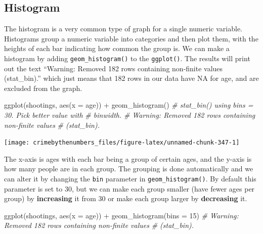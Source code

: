 \documentclass[
  a4paper,
]{krantz}
\makeatletter
\newenvironment{Shaded}{\begin{snugshade}}{\end{snugshade}}
\newcommand{\AttributeTok}[1]{\textcolor[rgb]{0.61,0.61,0.61}{#1}}
\newcommand{\CommentTok}[1]{\textcolor[rgb]{0.37,0.37,0.37}{\textit{#1}}}
\newcommand{\DecValTok}[1]{\textcolor[rgb]{0.06,0.06,0.06}{#1}}
\newcommand{\FunctionTok}[1]{\textcolor[rgb]{0,0,0}{#1}}
\newcommand{\NormalTok}[1]{#1}
\newcommand{\SpecialCharTok}[1]{\textcolor[rgb]{0,0,0}{#1}}
\newenvironment{kframe}{%
\medskip{}
\setlength{\fboxsep}{.8em}
 \def\at@end@of@kframe{}%
 \ifinner\ifhmode%
  \def\at@end@of@kframe{\end{minipage}}%
  \begin{minipage}{\columnwidth}%
 \fi\fi%
 \def\FrameCommand##1{\hskip\@totalleftmargin \hskip-\fboxsep
 \colorbox{shadecolor}{##1}\hskip-\fboxsep
     \hskip-\linewidth \hskip-\@totalleftmargin \hskip\columnwidth}%
 \MakeFramed {\advance\hsize-\width
   \@totalleftmargin\z@ \linewidth\hsize
   \@setminipage}}%
 {\par\unskip\endMakeFramed%
 \at@end@of@kframe}
\renewenvironment{Shaded}{\begin{kframe}}{\end{kframe}}
\makeatother
\begin{document}
\hypertarget{histogram}{%
\subsection{Histogram}\label{histogram}}

The histogram is a very common type of graph for a single
numeric variable. Histograms group a numeric variable into
categories and then plot them, with the heights of each bar
indicating how common the group is. We can make a histogram
by adding \texttt{geom\_histogram()} to the
\texttt{ggplot()}. The results will print out the text
``Warning: Removed 182 rows containing non-finite values
(stat\_bin).'' which just means that 182 rows in our data
have NA for age, and are excluded from the graph.

\begin{Shaded}
\begin{Highlighting}[]
\FunctionTok{ggplot}\NormalTok{(shootings, }\FunctionTok{aes}\NormalTok{(}\AttributeTok{x =}\NormalTok{ age)) }\SpecialCharTok{+}
  \FunctionTok{geom\_histogram}\NormalTok{()}
\CommentTok{\# \textasciigrave{}stat\_bin()\textasciigrave{} using \textasciigrave{}bins = 30\textasciigrave{}. Pick better value with}
\CommentTok{\# \textasciigrave{}binwidth\textasciigrave{}.}
\CommentTok{\# Warning: Removed 182 rows containing non{-}finite values}
\CommentTok{\# (stat\_bin).}
\end{Highlighting}
\end{Shaded}

\begin{center}\texttt{[image: crimebythenumbers\_files/figure-latex/unnamed-chunk-347-1]} \end{center}

The x-axis is ages with each bar being a group of certain
ages, and the y-axis is how many people are in each group.
The grouping is done automatically and we can alter it by
changing the \texttt{bin} parameter in
\texttt{geom\_histogram()}. By default this parameter is set
to 30, but we can make each group smaller (have fewer ages
per group) by \textbf{increasing} it from 30 or make each
group larger by \textbf{decreasing} it.

\begin{Shaded}
\begin{Highlighting}[]
\FunctionTok{ggplot}\NormalTok{(shootings, }\FunctionTok{aes}\NormalTok{(}\AttributeTok{x =}\NormalTok{ age)) }\SpecialCharTok{+}
  \FunctionTok{geom\_histogram}\NormalTok{(}\AttributeTok{bins =} \DecValTok{15}\NormalTok{)}
\CommentTok{\# Warning: Removed 182 rows containing non{-}finite values}
\CommentTok{\# (stat\_bin).}
\end{Highlighting}
\end{Shaded}
\end{document}
